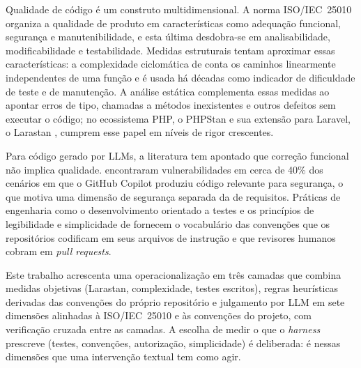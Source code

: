 Qualidade de código é um construto multidimensional. A norma ISO/IEC~25010
\cite{iso25010} organiza a qualidade de produto em características como
adequação funcional, segurança e manutenibilidade, e esta última desdobra-se
em analisabilidade, modificabilidade e testabilidade. Medidas estruturais
tentam aproximar essas características: a complexidade ciclomática de
 conta os caminhos linearmente independentes de uma
função e é usada há décadas como indicador de dificuldade de teste e de
manutenção. A análise estática complementa essas medidas ao apontar erros de
tipo, chamadas a métodos inexistentes e outros defeitos sem executar o código;
no ecossistema PHP, o PHPStan e sua extensão para Laravel, o Larastan
\cite{larastan2025}, cumprem esse papel em níveis de rigor crescentes.

Para código gerado por LLMs, a literatura tem apontado que correção funcional
não implica qualidade.  encontraram
vulnerabilidades em cerca de 40\% dos cenários em que o GitHub Copilot produziu
código relevante para segurança, o que motiva uma dimensão de segurança
separada da de requisitos. Práticas de engenharia como o desenvolvimento
orientado a testes \cite{beck2002tdd} e os princípios de legibilidade e
simplicidade de  fornecem o vocabulário das
convenções que os repositórios codificam em seus arquivos de instrução e que
revisores humanos cobram em \textit{pull requests}.

Este trabalho acrescenta uma operacionalização em três camadas que combina
medidas objetivas (Larastan, complexidade, testes escritos), regras
heurísticas derivadas das convenções do próprio repositório e julgamento por
LLM em sete dimensões alinhadas à ISO/IEC~25010 e às convenções do projeto,
com verificação cruzada entre as camadas. A escolha de medir o que o
\textit{harness} prescreve (testes, convenções, autorização, simplicidade) é
deliberada: é nessas dimensões que uma intervenção textual tem como agir.
